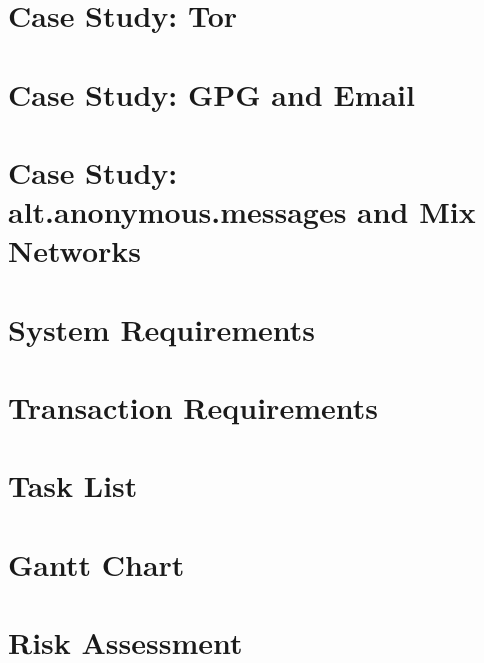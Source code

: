 \chapter{Case Study: Tor}


\chapter{Case Study: GPG and Email}


\chapter{Case Study: alt.anonymous.messages and Mix Networks}


\chapter{System Requirements}


\chapter{Transaction Requirements}


\chapter{Task List}


\chapter{Gantt Chart}


\chapter{Risk Assessment}

